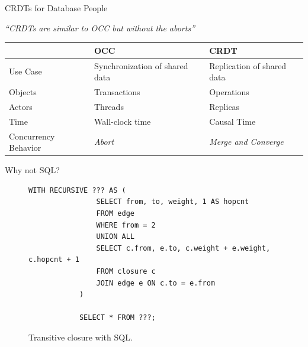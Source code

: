 \documentclass[USenglish,aspectratio=169]{beamer} %
\begin{document}
\begin{frame}{\acsp{CRDT} for Database People}
    \begin{center}
        \textit{``\acsp{CRDT} are similar to \acs{OCC} but without the aborts''}
    \end{center}

    \pause
    \begin{table}
        \center
        \begin{tabular}{@{} l l l @{}}
            \toprule
                                & \acs{OCC}                       & \acs{CRDT}                    \\
            \midrule
            Use Case             & Synchronization of shared data & Replication of shared data    \\
            \pause
            Objects              & Transactions                   & Operations                    \\
            \pause
            Actors               & Threads                        & Replicas                      \\
            \pause
            Time                 & Wall-clock time                & Causal Time                   \\
            \pause
            Concurrency Behavior & \emph{Abort}                   & \emph{Merge and Converge}     \\
            \bottomrule
        \end{tabular}
    \end{table}

\end{frame}

\begin{frame}[fragile]{Why not SQL?}
    \begin{figure}[h]
        \centering
        \begin{lstlisting}[keepspaces]
            WITH RECURSIVE ??? AS (
                SELECT from, to, weight, 1 AS hopcnt
                FROM edge
                WHERE from = 2
                UNION ALL
                SELECT c.from, e.to, c.weight + e.weight, c.hopcnt + 1
                FROM closure c
                JOIN edge e ON c.to = e.from
            )

            SELECT * FROM ???;\end{lstlisting}
        \caption{Transitive closure with SQL.}
    \end{figure}
\end{frame}
\end{document}

